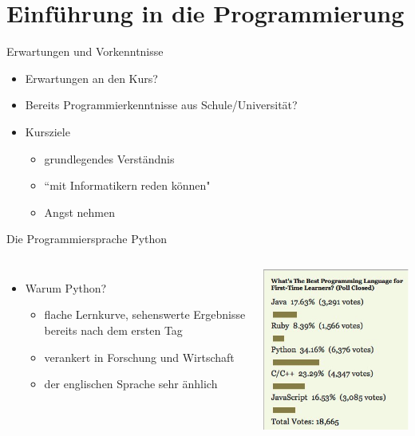 \section{Einführung in die Programmierung}

\begin{frame}{Erwartungen und Vorkenntnisse}
    \begin{itemize}
        \item Erwartungen an den Kurs?
        \item Bereits Programmierkenntnisse aus Schule/Universität?
        \item Kursziele 
            \begin{itemize}
                \item grundlegendes Verständnis
                \item ``mit Informatikern reden können"
                \item Angst nehmen
            \end{itemize}
    \end{itemize}
\end{frame}

\begin{frame}{Die Programmiersprache Python}
\begin{columns}
    \begin{itemize}
        \item Warum Python?
            \begin{itemize}
                \item flache Lernkurve, sehenswerte Ergebnisse bereits nach dem ersten Tag
                \item verankert in Forschung und Wirtschaft
                \item der englischen Sprache sehr änhlich
            \end{itemize}
    \end{itemize}
    \centering\includegraphics[scale=0.5]{images/best_lang} 
\end{columns}
\end{frame}


